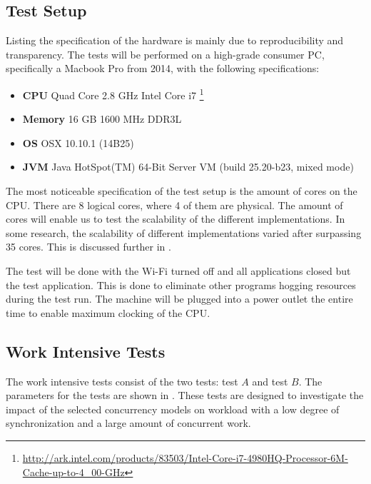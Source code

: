 \subsection{Test Setup}\label{subsec:hardware}
Listing the specification of the hardware is mainly due to reproducibility and transparency. The tests will be performed on a high-grade consumer PC, specifically a Macbook Pro from 2014, with the following specifications:
\begin{itemize}
	\item \textbf{CPU} Quad Core 2.8 GHz Intel Core i7 \footnote{\url{http://ark.intel.com/products/83503/Intel-Core-i7-4980HQ-Processor-6M-Cache-up-to-4_00-GHz}}
	\item \textbf{Memory} 16 GB 1600 MHz DDR3L
	\item \textbf{\ac{OS}} OSX 10.10.1 (14B25)
	\item \textbf{\ac{JVM}} Java HotSpot(TM) 64-Bit Server VM (build 25.20-b23, mixed mode)
\end{itemize}

The most noticeable specification of the test setup is the amount of cores on the \ac{CPU}. There are 8 logical cores, where 4 of them are physical. The amount of cores will enable us to test the scalability of the different implementations. In some research\cite{harris2003language}, the scalability of different implementations varied after surpassing 35 cores. This is discussed further in .

The test will be done with the Wi-Fi turned off and all applications closed but the test application. This is done to eliminate other programs hogging resources during the test run. The machine will be plugged into a power outlet the entire time to enable maximum clocking of the \ac{CPU}.

\subsection{Work Intensive Tests}
The work intensive tests consist of the two tests: test $A$ and test $B$. The parameters for the tests are shown in . These tests are designed to investigate the impact of the selected concurrency models on workload with a low degree of synchronization and a large amount of concurrent work.

